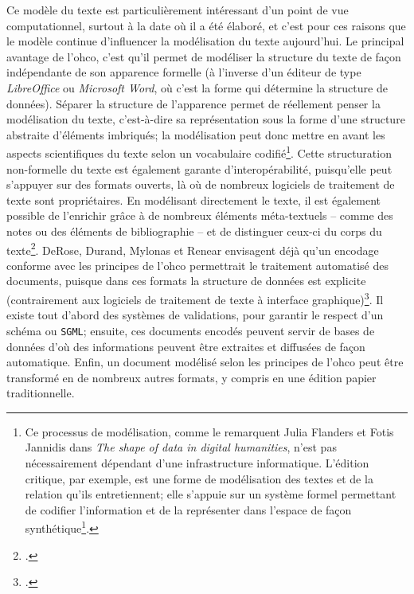 Ce modèle du texte est particulièrement intéressant d'un point de vue computationnel, surtout à la date où il a été élaboré, et c'est pour ces raisons que le modèle continue d'influencer la modélisation du texte aujourd'hui. Le principal avantage de l'\gls{ohco}, c'est qu'il permet de modéliser la structure du texte de façon indépendante de son apparence formelle (à l'inverse d'un éditeur de type \textit{LibreOffice} ou \textit{Microsoft Word}, où c'est la forme qui détermine la structure de données). Séparer la structure de l'apparence permet de réellement penser la modélisation du texte, c'est-à-dire sa représentation sous la forme d'une structure abstraite d'éléments imbriqués; la modélisation peut donc mettre en avant les aspects scientifiques du texte selon un vocabulaire codifié\footnote{
	Ce processus de modélisation, comme le remarquent Julia Flanders et Fotis Jannidis dans \textit{The shape of data in digital humanities}, n'est pas nécessairement dépendant d'une infrastructure informatique. L'édition critique, par exemple, est une forme de modélisation des textes et de la relation qu'ils entretiennent; elle s'appuie sur un système formel permettant de codifier l'information et de la représenter dans l'espace de façon synthétique\footcite[p. 3-4]{flanders_data_2019}.
}. Cette structuration non-formelle du texte est également garante d'interopérabilité, puisqu'elle peut s'appuyer sur des formats ouverts, là où de nombreux logiciels de traitement de texte sont propriétaires. En modélisant directement le texte, il est également possible de l'enrichir grâce à de nombreux éléments méta-textuels -- comme des notes ou des éléments de bibliographie -- et de distinguer ceux-ci du corps du texte\footcite[p. 11-13]{derose_what_1990}. DeRose, Durand, Mylonas et Renear envisagent déjà qu'un encodage conforme avec les principes de l'\gls{ohco} permettrait le traitement automatisé des documents, puisque dans ces formats la structure de données est explicite (contrairement aux logiciels de traitement de texte à interface graphique)\footcite[p. 17-18]{derose_what_1990}. Il existe tout d'abord des systèmes de validations, pour garantir le respect d'un schéma \xml{} ou \texttt{SGML}; ensuite, ces documents encodés peuvent servir de bases de données d'où des informations peuvent être extraites et diffusées de façon automatique. Enfin, un document modélisé selon les principes de l'\gls{ohco} peut être transformé en de nombreux autres formats, y compris en une édition papier traditionnelle.

